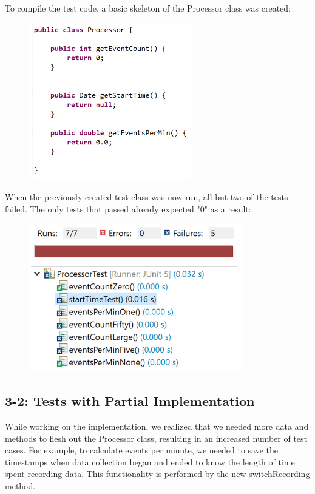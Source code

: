 \documentclass[11pt,a4paper]{article}
\begin{document}
To compile the test code, a basic skeleton of the Processor class was created:

\begin{figure}[h]
	\includegraphics[width=0.63\textwidth]{codeimg2.png}
\end{figure}

When the previously created test class was now run, all but two of the tests failed. The only tests that passed already expected "0" as a result:

\begin{figure}[h]
	\includegraphics[width=0.83\textwidth]{codeimg3.png}
	\end{figure}
	
\newpage
\subsection*{3-2: Tests with Partial Implementation}

While working on the implementation, we realized that we needed more data and methods to flesh out the Processor class, resulting in an increased number of test cases. For example, to calculate events per minute, we needed to save the timestamps when data collection began and ended to know the length of time spent recording data. This functionality is performed by the new switchRecording method.
 
\end{document}
